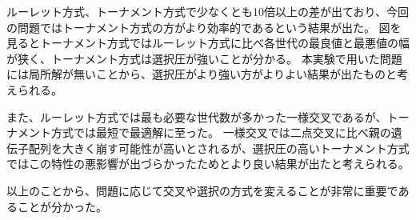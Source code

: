 \documentclass{jsarticle}
\begin{document}
ルーレット方式、トーナメント方式で少なくとも10倍以上の差が出ており、今回の問題ではトーナメント方式の方がより効率的であるという結果が出た。
図を見るとトーナメント方式ではルーレット方式に比べ各世代の最良値と最悪値の幅が狭く、トーナメント方式は選択圧が強いことが分かる。
本実験で用いた問題には局所解が無いことから、選択圧がより強い方がよりよい結果が出たものと考えられる。

また、ルーレット方式では最も必要な世代数が多かった一様交叉であるが、トーナメント方式では最短で最適解に至った。
一様交叉では二点交叉に比べ親の遺伝子配列を大きく崩す可能性が高いとされるが、選択圧の高いトーナメント方式ではこの特性の悪影響が出づらかったためとより良い結果が出たと考えられる。

以上のことから、問題に応じて交叉や選択の方式を変えることが非常に重要であることが分かった。
\end{document}
